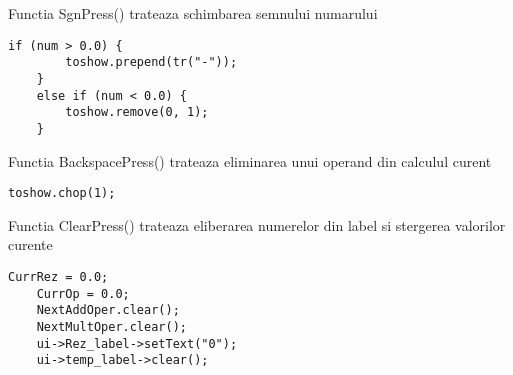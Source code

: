 \begin{itemize}
Functia SgnPress() trateaza schimbarea semnului numarului

\begin{lstlisting}
if (num > 0.0) {
		toshow.prepend(tr("-"));
	}
	else if (num < 0.0) {
		toshow.remove(0, 1);
	}
\end{lstlisting}

Functia BackspacePress() trateaza eliminarea unui operand din calculul curent

\begin{lstlisting}
toshow.chop(1);
\end{lstlisting}

Functia ClearPress() trateaza eliberarea numerelor din label si stergerea valorilor curente

\begin{lstlisting}
CurrRez = 0.0;
	CurrOp = 0.0;
	NextAddOper.clear();
	NextMultOper.clear();
	ui->Rez_label->setText("0");
	ui->temp_label->clear();
\end{lstlisting}

\end{itemize}
